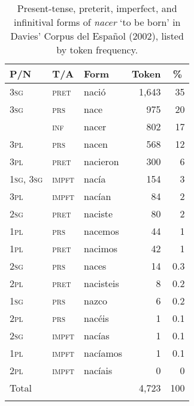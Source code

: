 \documentclass[output=paper,colorlinks,citecolor=brown]{langscibook}
\begin{document}
\begin{table}
\begin{tabular}{lllrr}
\lsptoprule
P/N & T/A & {Form} & {Token} & \multicolumn{1}{c}{\%}\\\midrule
3\textsc{sg}               & \textsc{pret} & nació & 1,643  & 35\phantom{.0} \\
3\textsc{sg}               & \textsc{prs} & nace  & 975     & 20\phantom{.0}\\
                           & \textsc{inf} & nacer & 802     & 17\phantom{.0}\\
3\textsc{pl}               & \textsc{prs} & nacen & 568     & 12\phantom{.0}\\
3\textsc{pl}               & \textsc{pret} & nacieron & 300 & 6\phantom{.0}\\
1\textsc{sg}, 3\textsc{sg} & \textsc{impft} & nacía & 154   & 3\phantom{.0} \\
3\textsc{pl}               & \textsc{impft} & nacían & 84   & 2\phantom{.0} \\
2\textsc{sg}               & \textsc{pret} & naciste &  80  & 2\phantom{.0} \\
1\textsc{pl}               & \textsc{prs} & nacemos & 44    & 1\phantom{.0} \\
1\textsc{pl}               & \textsc{pret} & nacimos & 42   & 1\phantom{.0} \\
2\textsc{sg}               & \textsc{prs} & naces & 14     & 0.3 \\
2\textsc{pl}               & \textsc{pret}& nacisteis & 8 & 0.2\\
1\textsc{sg}               & \textsc{prs} & nazco & 6 & 0.2 \\
2\textsc{pl}               & \textsc{prs} & nacéis & 1 & 0.1\\
2\textsc{sg}               & \textsc{impft} & nacías & 1 & 0.1\\
1\textsc{pl}               & \textsc{impft} & nacíamos & 1 & 0.1\\
2\textsc{pl}               & \textsc{impft} & nacíais & 0 & 0\phantom{.0}\\
\midrule
{Total} & & & 4,723 &100\\
\lspbottomrule
\end{tabular}
\caption{Present-tense, preterit, imperfect, and infinitival forms of \textit{nacer} `to be born' in Davies' Corpus del Español (2002), listed by token frequency.\label{tab:clements:1}}
\end{table}
\end{document}
